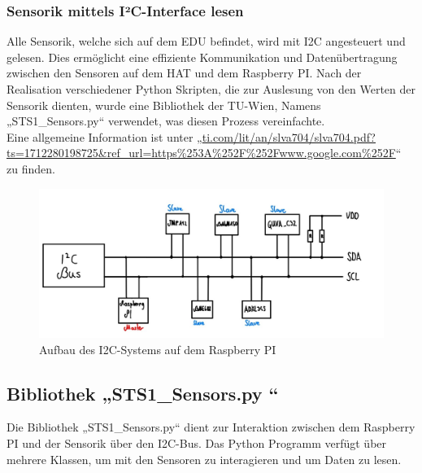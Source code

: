 \subsubsection{Sensorik mittels I²C-Interface lesen}\label{i2C}
Alle Sensorik, welche sich auf dem EDU befindet, wird mit I2C angesteuert und gelesen. Dies ermöglicht eine effiziente Kommunikation und Datenübertragung zwischen den Sensoren auf dem HAT und dem Raspberry PI. Nach der Realisation verschiedener Python Skripten, die zur Auslesung von den Werten der Sensorik dienten, wurde eine Bibliothek der TU-Wien, Namens „STS1\_Sensors.py“ verwendet, was diesen Prozess vereinfachte.\\
\vspace{3mm}
Eine allgemeine Information ist unter „\url{ti.com/lit/an/slva704/slva704.pdf?ts=1712280198725&ref_url=https%253A%252F%252Fwww.google.com%252F}“ zu finden.\\
\begin{figure}[H]
	\centering
	\includegraphics[scale=1.1]{image/constibild.jpg}
	\caption{Aufbau des I2C-Systems auf dem Raspberry PI }
\end{figure}


\subsection{Bibliothek „STS1\_Sensors.py “}\label{bib}
Die Bibliothek „STS1\_Sensors.py“ dient zur Interaktion zwischen dem Raspberry PI und der Sensorik über den I2C-Bus. Das Python Programm verfügt über mehrere Klassen, um mit den Sensoren zu interagieren und um Daten zu lesen. \\
\vspace{3mm}


